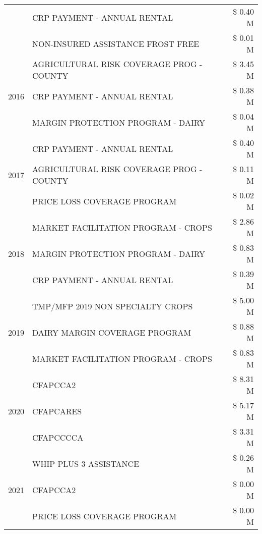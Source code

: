 \begin{tabular}{llr}
 & CRP PAYMENT - ANNUAL RENTAL & \$ 0.40 M \\
 & NON-INSURED ASSISTANCE FROST FREE & \$ 0.01 M \\
\cline{1-3}
\multirow[t]{3}{*}{2016} & AGRICULTURAL RISK COVERAGE PROG - COUNTY & \$ 3.45 M \\
 & CRP PAYMENT - ANNUAL RENTAL & \$ 0.38 M \\
 & MARGIN PROTECTION PROGRAM - DAIRY & \$ 0.04 M \\
\cline{1-3}
\multirow[t]{3}{*}{2017} & CRP PAYMENT - ANNUAL RENTAL & \$ 0.40 M \\
 & AGRICULTURAL RISK COVERAGE PROG - COUNTY & \$ 0.11 M \\
 & PRICE LOSS COVERAGE PROGRAM & \$ 0.02 M \\
\cline{1-3}
\multirow[t]{3}{*}{2018} & MARKET FACILITATION PROGRAM - CROPS & \$ 2.86 M \\
 & MARGIN PROTECTION PROGRAM - DAIRY & \$ 0.83 M \\
 & CRP PAYMENT - ANNUAL RENTAL & \$ 0.39 M \\
\cline{1-3}
\multirow[t]{3}{*}{2019} & TMP/MFP 2019 NON SPECIALTY CROPS & \$ 5.00 M \\
 & DAIRY MARGIN COVERAGE PROGRAM & \$ 0.88 M \\
 & MARKET FACILITATION PROGRAM - CROPS & \$ 0.83 M \\
\cline{1-3}
\multirow[t]{3}{*}{2020} & CFAPCCA2 & \$ 8.31 M \\
 & CFAPCARES & \$ 5.17 M \\
 & CFAPCCCCA & \$ 3.31 M \\
\cline{1-3}
\multirow[t]{3}{*}{2021} & WHIP PLUS 3 ASSISTANCE & \$ 0.26 M \\
 & CFAPCCA2 & \$ 0.00 M \\
 & PRICE LOSS COVERAGE PROGRAM & \$ 0.00 M \\
\cline{1-3}
\bottomrule
\end{tabular}
